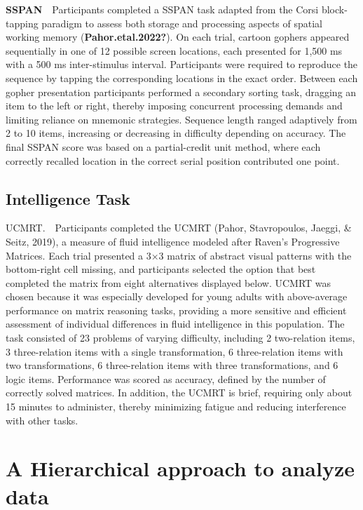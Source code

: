 \documentclass[
  ,man]{apa6}
\begin{document}
\textbf{SSPAN}\(\quad\)Participants completed a SSPAN task adapted from the Corsi block-tapping paradigm to assess both storage and processing aspects of spatial working memory (\textbf{Pahor.etal.2022?}). On each trial, cartoon gophers appeared sequentially in one of 12 possible screen locations, each presented for 1,500 ms with a 500 ms inter-stimulus interval. Participants were required to reproduce the sequence by tapping the corresponding locations in the exact order. Between each gopher presentation participants performed a secondary sorting task, dragging an item to the left or right, thereby imposing concurrent processing demands and limiting reliance on mnemonic strategies. Sequence length ranged adaptively from 2 to 10 items, increasing or decreasing in difficulty depending on accuracy. The final SSPAN score was based on a partial-credit unit method, where each correctly recalled location in the correct serial position contributed one point.

\subsection{Intelligence Task}\label{intelligence-task}

UCMRT.\(\quad\)Participants completed the UCMRT (Pahor, Stavropoulos, Jaeggi, \& Seitz, 2019), a measure of fluid intelligence modeled after Raven's Progressive Matrices. Each trial presented a 3×3 matrix of abstract visual patterns with the bottom-right cell missing, and participants selected the option that best completed the matrix from eight alternatives displayed below. UCMRT was chosen because it was especially developed for young adults with above-average performance on matrix reasoning tasks, providing a more sensitive and efficient assessment of individual differences in fluid intelligence in this population. The task consisted of 23 problems of varying difficulty, including 2 two-relation items, 3 three-relation items with a single transformation, 6 three-relation items with two transformations, 6 three-relation items with three transformations, and 6 logic items. Performance was scored as accuracy, defined by the number of correctly solved matrices. In addition, the UCMRT is brief, requiring only about 15 minutes to administer, thereby minimizing fatigue and reducing interference with other tasks.

\section{A Hierarchical approach to analyze data}\label{a-hierarchical-approach-to-analyze-data}
\end{document}
